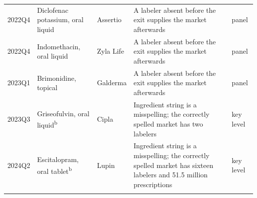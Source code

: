 \begin{tabular}{@{}lp{2.9cm}p{1.7cm}p{3.9cm}p{1.5cm}@{}}
2022Q4 & Diclofenac potassium, oral liquid & Assertio & A labeler absent before the exit supplies the market afterwards & panel \\
2022Q4 & Indomethacin, oral liquid & Zyla Life & A labeler absent before the exit supplies the market afterwards & panel \\
2023Q1 & Brimonidine, topical & Galderma & A labeler absent before the exit supplies the market afterwards & panel \\
2023Q3 & Griseofulvin, oral liquid\textsuperscript{b} & Cipla & Ingredient string is a misspelling; the correctly spelled market has two labelers & key level \\
2024Q2 & Escitalopram, oral tablet\textsuperscript{b} & Lupin & Ingredient string is a misspelling; the correctly spelled market has sixteen labelers and 51.5 million prescriptions & key level \\
\botrule
\end{tabular}
